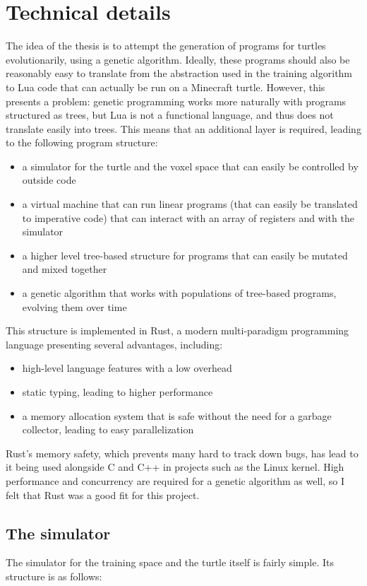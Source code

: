 \documentclass{report}
\begin{document}
\chapter{Technical details}
The idea of the thesis is to attempt the generation of programs for turtles evolutionarily, using a genetic algorithm. Ideally, these programs should also be reasonably easy to translate from the abstraction used in the training algorithm to Lua code that can actually be run on a Minecraft turtle. However, this presents a problem: genetic programming works more naturally with programs structured as trees, but Lua is not a functional language, and thus does not translate easily into trees. This means that an additional layer is required, leading to the following program structure:

\begin{itemize}
    \item a simulator for the turtle and the voxel space that can easily be controlled by outside code
    \item a virtual machine that can run linear programs (that can easily be translated to imperative code) that can interact with an array of registers and with the simulator
    \item a higher level tree-based structure for programs that can easily be mutated and mixed together
    \item a genetic algorithm that works with populations of tree-based programs, evolving them over time
\end{itemize}

This structure is implemented in Rust, a modern multi-paradigm programming language presenting several advantages, including:
\begin{itemize}
    \item high-level language features with a low overhead
    \item static typing, leading to higher performance
    \item a memory allocation system that is safe without the need for a garbage collector, leading to easy parallelization
\end{itemize}
Rust's memory safety, which prevents many hard to track down bugs, has lead to it being used alongside C and C++ in projects such as the Linux kernel. High performance and concurrency are required for a genetic algorithm as well, so I felt that Rust was a good fit for this project.

\section{The simulator}
The simulator for the training space and the turtle itself is fairly simple. Its structure is as follows:
\end{document}
